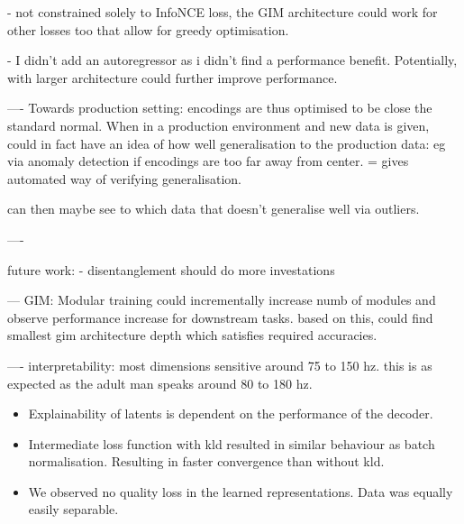 \documentclass[]{book}
\begin{document}
- not constrained solely to InfoNCE loss, the GIM architecture could work for other losses too that allow for greedy optimisation.


- I didn't add an autoregressor as i didn't find a performance benefit. Potentially, with larger architecture could further improve performance.



----
Towards production setting:
	encodings are thus optimised to be close the standard normal. When in a production environment and new data is given, could in fact have an idea of how well generalisation to the production data: eg via anomaly detection if encodings are too far away from center. 
	= gives automated way of verifying generalisation.
	
	can then maybe see to which data that doesn't generalise well via outliers.
	
----


future work:
- disentanglement should do more investations


---
GIM: Modular training
could incrementally increase numb of modules and observe performance increase for downstream tasks.
based on this, could find smallest gim architecture depth which satisfies required accuracies.

----
interpretability:
most dimensions sensitive around 75 to 150 hz. this is as expected as the adult man speaks around 80 to 180 hz.



\begin{itemize}
	\item Explainability of latents is dependent on the performance of the decoder.
	\item Intermediate loss function with kld resulted in similar behaviour as batch normalisation. Resulting in faster convergence than without kld.
	\item We observed no quality loss in the learned representations. Data was equally easily separable.
\end{itemize}








\end{document}
